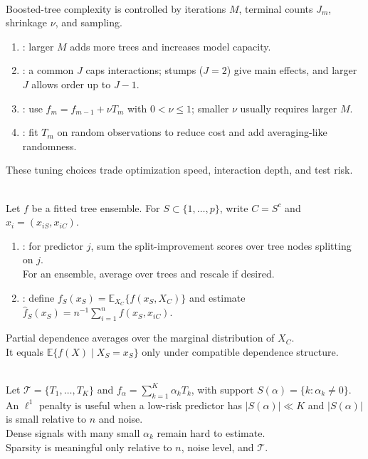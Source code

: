 \begin{remark} \label{rem:sl-boosted-tree-regularization} \\
Boosted-tree complexity is controlled by iterations $M$, terminal counts $J_m$, shrinkage $\nu$, and sampling.
\begin{enumerate}[label=(\roman*)]
\setlength{\itemsep}{0pt}
\item {}: larger $M$ adds more trees and increases model capacity.
\item {}: a common $J$ caps interactions; stumps ($J=2$) give main effects, and larger $J$ allows order up to $J-1$.
\item {}: use $f_m=f_{m-1}+\nu T_m$ with $0<\nu\le1$; smaller $\nu$ usually requires larger $M$.
\item {}: fit $T_m$ on random observations to reduce cost and add averaging-like randomness.
\end{enumerate}
These tuning choices trade optimization speed, interaction depth, and test risk.
\end{remark}

\begin{method} \label{meth:sl-boosted-tree-interpretation} \\
Let $f$ be a fitted tree ensemble.  For $S\subset\{1,\ldots,p\}$, write $C=S^c$ and $x_i=(x_{iS},x_{iC})$.
\begin{enumerate}[label=(\roman*)]
\setlength{\itemsep}{0pt}
\item {}: for predictor $j$, sum the split-improvement scores over tree nodes splitting on $j$.\\
For an ensemble, average over trees and rescale if desired.
\item {}: define $f_S(x_S)=\mathbb{E}_{X_C}\{f(x_S,X_C)\}$ and estimate $\widehat f_S(x_S)=n^{-1}\sum\limits_{i=1}^n f(x_S,x_{iC})$.
\end{enumerate}
Partial dependence averages over the marginal distribution of $X_C$.\\
It equals $\mathbb{E}\{f(X)\mid X_S=x_S\}$ only under compatible dependence structure.
\end{method}

\begin{principle} \label{prin:sl-bet-on-sparsity} \\
Let $\mathcal T=\{T_1,\ldots,T_K\}$ and $f_\alpha=\sum\limits_{k=1}^K\alpha_kT_k$, with support $S(\alpha)=\{k:\alpha_k\neq0\}$.\\
An $\ell^1$ penalty is useful when a low-risk predictor has $|S(\alpha)|\ll K$ and $|S(\alpha)|$ is small relative to $n$ and noise.\\
Dense signals with many small $\alpha_k$ remain hard to estimate.\\
Sparsity is meaningful only relative to $n$, noise level, and $\mathcal T$.
\end{principle}

